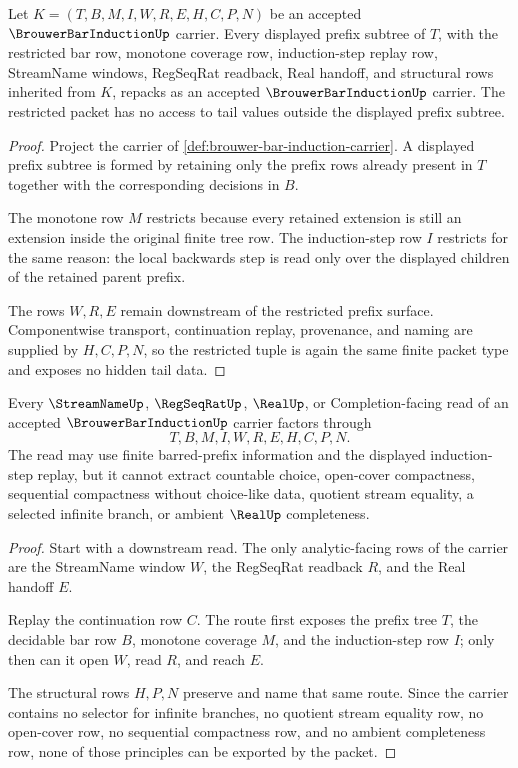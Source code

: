 \begin{theorem}
\label{thm:brouwer-bar-induction-prefix-stability}
Let $K=(T,B,M,I,W,R,E,H,C,P,N)$ be an accepted $\BrouwerBarInductionUp$ carrier. Every displayed prefix subtree of $T$, with the restricted bar row, monotone coverage row, induction-step replay row, StreamName windows, RegSeqRat readback, Real handoff, and structural rows inherited from $K$, repacks as an accepted $\BrouwerBarInductionUp$ carrier. The restricted packet has no access to tail values outside the displayed prefix subtree.
\end{theorem}
\begin{proof}
Project the carrier of \autoref{def:brouwer-bar-induction-carrier}. A displayed prefix subtree is formed by retaining only the prefix rows already present in $T$ together with the corresponding decisions in $B$.

The monotone row $M$ restricts because every retained extension is still an extension inside the original finite tree row. The induction-step row $I$ restricts for the same reason: the local backwards step is read only over the displayed children of the retained parent prefix.

The rows $W,R,E$ remain downstream of the restricted prefix surface. Componentwise transport, continuation replay, provenance, and naming are supplied by $H,C,P,N$, so the restricted tuple is again the same finite packet type and exposes no hidden tail data.
\end{proof}

\begin{theorem}
\label{thm:brouwer-bar-induction-choice-boundary}
Every $\StreamNameUp$, $\RegSeqRatUp$, $\RealUp$, or Completion-facing read of an accepted $\BrouwerBarInductionUp$ carrier factors through
$$
T,B,M,I,W,R,E,H,C,P,N.
$$
The read may use finite barred-prefix information and the displayed induction-step replay, but it cannot extract countable choice, open-cover compactness, sequential compactness without choice-like data, quotient stream equality, a selected infinite branch, or ambient $\RealUp$ completeness.
\end{theorem}
\begin{proof}
Start with a downstream read. The only analytic-facing rows of the carrier are the StreamName window $W$, the RegSeqRat readback $R$, and the Real handoff $E$.

Replay the continuation row $C$. The route first exposes the prefix tree $T$, the decidable bar row $B$, monotone coverage $M$, and the induction-step row $I$; only then can it open $W$, read $R$, and reach $E$.

The structural rows $H,P,N$ preserve and name that same route. Since the carrier contains no selector for infinite branches, no quotient stream equality row, no open-cover row, no sequential compactness row, and no ambient completeness row, none of those principles can be exported by the packet.
\end{proof}

